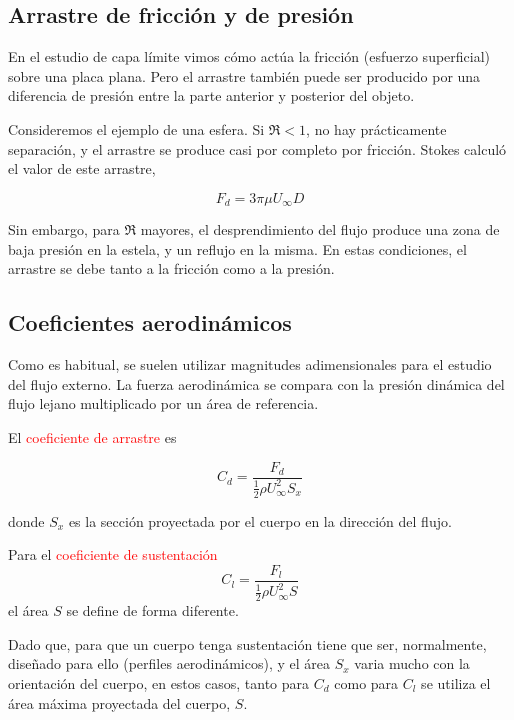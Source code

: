 \subsection{Arrastre de fricción y de presión}

	
	En el estudio de capa límite vimos cómo actúa la fricción (esfuerzo
	superficial) sobre una placa plana. Pero el arrastre también puede
	ser producido por una diferencia de presión entre la parte anterior
	y posterior del objeto.
	
	Consideremos el ejemplo de una esfera. Si $\Re<1$, no hay prácticamente
	separación, y el arrastre se produce casi por completo por fricción.
	Stokes calculó el valor de este arrastre, 
	
\begin{equation}
		F_{d}=3\pi\mu U_{\infty}D
\end{equation}
	
	
	Sin embargo, para $\Re$ mayores, el desprendimiento del flujo produce
	una zona de baja presión en la estela, y un reflujo en la misma. En
	estas condiciones, el arrastre se debe tanto a la fricción como a
	la presión.


\subsection{Coeficientes aerodinámicos}

	
	Como es habitual, se suelen utilizar magnitudes adimensionales para
	el estudio del flujo externo. La fuerza aerodinámica se compara con
	la presión dinámica del flujo lejano multiplicado por un área de referencia.
	
	El \textcolor{red}{coeficiente de arrastre} es 
	
\begin{equation}
		C_{d}=\dfrac{F_{d}}{\frac{1}{2}\rho U_{\infty}^{2}S_{x}}
\end{equation}
	
	donde $S_{x}$ es la sección proyectada por el cuerpo en la dirección
	del flujo.
	
	Para el \textcolor{red}{coeficiente de sustentación} 
\begin{equation}
		C_{l}=\dfrac{F_{l}}{\frac{1}{2}\rho U_{\infty}^{2}S}
\end{equation}
el área $S$ se define de forma diferente. 

	
	Dado que, para que un cuerpo tenga sustentación tiene que ser, normalmente,
	diseñado para ello (perfiles aerodinámicos), y el área $S_{x}$ varia
	mucho con la orientación del cuerpo, en estos casos, tanto para $C_{d}$
	como para $C_{l}$ se utiliza el área máxima proyectada del cuerpo,
	$S$.
	
